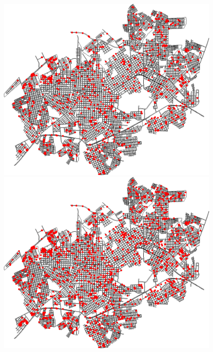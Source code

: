 \begin{figure}[H]
\begin{minipage}{.5\textwidth}
    \captionsetup{labelformat=empty}
  \end{minipage}
  \begin{minipage}{.5\textwidth}
    \centering
    \includegraphics[width=1.0\textwidth]{Figuras/Resultados/0001/Saidas_GPU_BIT/MonteCarlo_0/Simulacao_0/Espacial/00080.png}
    \captionsetup{labelformat=empty}
  \end{minipage}%
  \centering
  \begin{minipage}{.5\textwidth}
    \centering
    \includegraphics[width=1.0\textwidth]{Figuras/Resultados/0001/Saidas_GPU_BIT/MonteCarlo_0/Simulacao_0/Espacial/00120.png}

\end{minipage}
\end{figure}
